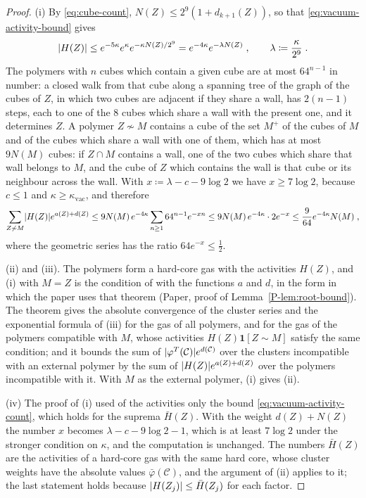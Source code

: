 \documentclass[11pt]{preprint}
\DeclarePairedDelimiter{\abs}{\lvert}{\rvert}
\numberwithin{equation}{section}
\theoremstyle{definition}
\theoremstyle{remark}
\theoremstyle{plain}
\begin{document}
\begin{proof}
(i) By \eqref{eq:cube-count}, $N(Z) \leq 2^9(1 + d_{k+1}(Z))$, so that \eqref{eq:vacuum-activity-bound} gives
\begin{equation}\label{eq:vacuum-activity-count}
    \abs{H(Z)} \leq e^{-5\kappa}e^{\kappa}e^{-\kappa N(Z)/2^9} = e^{-4\kappa}e^{-\lambda N(Z)}\;,
    \qquad
    \lambda \coloneqq \frac{\kappa}{2^9}\;.
\end{equation}
The polymers with $n$ cubes which contain a given cube are at most $64^{n-1}$ in number: a closed walk from that cube along a spanning tree of the graph of the cubes of $Z$, in which two cubes are adjacent if they share a wall, has $2(n - 1)$ steps, each to one of the $8$ cubes which share a wall with the present one, and it determines $Z$. A polymer $Z \not\sim M$ contains a cube of the set $M^+$ of the cubes of $M$ and of the cubes which share a wall with one of them, which has at most $9N(M)$ cubes: if $Z \cap M$ contains a wall, one of the two cubes which share that wall belongs to $M$, and the cube of $Z$ which contains the wall is that cube or its neighbour across the wall. With $x \coloneqq \lambda - c - 9\log 2$ we have $x \geq 7\log 2$, because $c \leq 1$ and $\kappa \geq \kappa_{\mathrm{vac}}$, and therefore
\[
    \sum_{Z \not\sim M}\abs{H(Z)}e^{a(Z) + d(Z)} \leq 9N(M)\,e^{-4\kappa}\sum_{n \geq 1}64^{n-1}e^{-xn} \leq 9N(M)\,e^{-4\kappa}\cdot 2e^{-x} \leq \frac{9}{64}e^{-4\kappa}N(M)\;,
\]
where the geometric series has the ratio $64e^{-x} \leq \frac12$.

(ii) and (iii). The polymers form a hard-core gas with the activities $H(Z)$, and (i) with $M = Z$ is the condition of \cite[Theorem~5.4]{FriedliVelenik} with the functions $a$ and $d$, in the form in which the paper uses that theorem (Paper, proof of Lemma~\ref{P-lem:root-bound}). The theorem gives the absolute convergence of the cluster series and the exponential formula of (iii) for the gas of all polymers, and for the gas of the polymers compatible with $M$, whose activities $H(Z)\mathbf 1[Z \sim M]$ satisfy the same condition; and it bounds the sum of $\abs{\varphi^T(\mathcal C)}e^{d(\mathcal C)}$ over the clusters incompatible with an external polymer by the sum of $\abs{H(Z)}e^{a(Z) + d(Z)}$ over the polymers incompatible with it. With $M$ as the external polymer, (i) gives (ii).

(iv) The proof of (i) used of the activities only the bound \eqref{eq:vacuum-activity-count}, which holds for the suprema $\bar H(Z)$. With the weight $d(Z) + N(Z)$ the number $x$ becomes $\lambda - c - 9\log 2 - 1$, which is at least $7\log 2$ under the stronger condition on $\kappa$, and the computation is unchanged. The numbers $\bar H(Z)$ are the activities of a hard-core gas with the same hard core, whose cluster weights have the absolute values $\bar\varphi(\mathcal C)$, and the argument of (ii) applies to it; the last statement holds because $\abs{H(Z_j)} \leq \bar H(Z_j)$ for each factor.
\end{proof}
\end{document}
